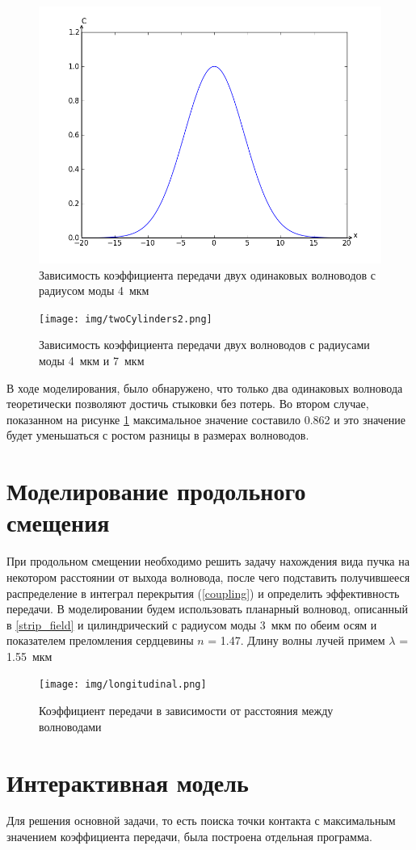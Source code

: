 \begin{figure}[h!]
		\includegraphics[width=0.5\linewidth]{img/twoCylinders.png}
		\caption{Зависимость коэффициента передачи двух одинаковых волноводов с радиусом моды 4~мкм}
\end{figure}
\begin{figure}[h!]
		\texttt{[image: img/twoCylinders2.png]}
		\caption{Зависимость коэффициента передачи двух волноводов с радиусами моды 4~мкм и 7~мкм}
		\label{twoCylinders2}
\end{figure}

В ходе моделирования, было обнаружено, что только два одинаковых волновода теоретически позволяют достичь стыковки без потерь. Во втором случае, показанном на рисунке \ref{twoCylinders2} максимальное значение составило 0.862 и это значение будет уменьшаться с ростом разницы в размерах волноводов.

\section{Моделирование продольного смещения}
При продольном смещении необходимо решить задачу нахождения вида пучка на некотором расстоянии от выхода волновода, после чего подставить получившееся распределение в интеграл перекрытия (\ref{coupling}) и определить эффективность передачи.
В моделировании будем использовать планарный волновод, описанный в \ref{strip_field} и цилиндрический с радиусом моды 3~мкм по обеим осям и показателем преломления сердцевины $n$ = 1.47. Длину волны лучей примем $\lambda$ = 1.55~мкм

\begin{figure}[h!]
	\texttt{[image: img/longitudinal.png]}
	\caption{Коэффициент передачи в зависимости от расстояния между волноводами}
	\label{longitudinal}
\end{figure}

\section{Интерактивная модель}
Для решения основной задачи, то есть поиска точки контакта с максимальным значением коэффициента передачи, была построена отдельная программа.

